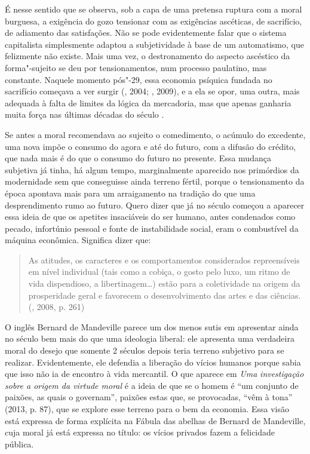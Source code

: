 É nesse sentido que se observa, sob a capa de uma pretensa ruptura com a
moral burguesa, a exigência do gozo tensionar com as exigências
ascéticas, de sacrifício, de adiamento das satisfações. Não se pode
evidentemente falar que o sistema capitalista simplesmente adaptou a
subjetividade à base de um automatismo, que felizmente não existe. Mais
uma vez, o destronamento do aspecto ascéstico da forma"-sujeito se deu
por tensionamentos, num processo paulatino, mas constante. Naquele
momento pós"-29, essa economia psíquica fundada no sacrifício começava a
ver surgir (, 2004; , 2009), e a ela se opor, uma outra,
mais adequada à falta de limites da lógica da mercadoria, mas que apenas
ganharia muita força nas últimas décadas do século .

Se antes a moral recomendava ao sujeito o comedimento, o acúmulo do
excedente, uma nova impõe o consumo do agora e até do futuro, com a
difusão do crédito, que nada mais é do que o consumo do futuro no
presente. Essa mudança subjetiva já tinha, há algum tempo, marginalmente
aparecido nos primórdios da modernidade sem que conseguisse ainda
terreno fértil, porque o tensionamento da época apontava mais para um
arraigamento na tradição do que uma desprendimento rumo ao futuro. Quero
dizer que já no século  começou a aparecer essa ideia de que os
apetites insaciáveis do ser humano, antes condenados como pecado,
infortúnio pessoal e fonte de instabilidade social, eram o combustível
da máquina econômica. Significa dizer que:

\begin{quote}
As atitudes, os caracteres e os comportamentos considerados
repreensíveis em nível individual (tais como a cobiça, o gosto pelo
luxo, um ritmo de vida dispendioso, a libertinagem\ldots{}) estão para a
coletividade na origem da prosperidade geral e favorecem o
desenvolvimento das artes e das ciências. (, 2008, p. 261)
\end{quote}

O inglês Bernard de Mandeville parece um dos menos sutis em apresentar
ainda no século  bem mais do que uma ideologia liberal: ele
apresenta uma verdadeira moral do desejo que somente 2 séculos depois
teria terreno subjetivo para se realizar. Evidentemente, ele defendia a
liberação do vícios humanos porque sabia que isso não ia de encontro à
vida mercantil. O que aparece em \emph{Uma} \emph{investigação sobre a
origem da virtude moral} é a ideia de que se o homem é ``um conjunto de
paixões, as quais o governam'', paixões estas que, se provocadas, ``vêm
à tona'' (2013, p. 87), que se explore esse terreno para o bem da
economia. Essa visão está expressa de forma explícita na Fábula das
abelhas de Bernard de Mandeville, cuja moral já está expressa no título:
os vícios privados fazem a felicidade pública.

